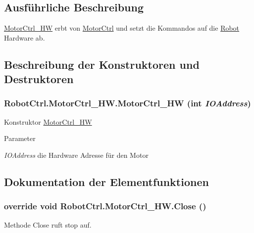 \subsection{Ausführliche Beschreibung}
\hyperlink{class_robot_ctrl_1_1_motor_ctrl___h_w}{MotorCtrl\_\-HW} erbt von \hyperlink{class_robot_ctrl_1_1_motor_ctrl}{MotorCtrl} und setzt die Kommandos auf die \hyperlink{class_robot_ctrl_1_1_robot}{Robot} Hardware ab. 

\subsection{Beschreibung der Konstruktoren und Destruktoren}
\hypertarget{class_robot_ctrl_1_1_motor_ctrl___h_w_af9fb7c75d12f00d852304d58bd31bcea}{
\subsubsection[{MotorCtrl\_\-HW}]{\setlength{\rightskip}{0pt plus 5cm}RobotCtrl.MotorCtrl\_\-HW.MotorCtrl\_\-HW (int {\em IOAddress})}}
\label{class_robot_ctrl_1_1_motor_ctrl___h_w_af9fb7c75d12f00d852304d58bd31bcea}
Konstruktor \hyperlink{class_robot_ctrl_1_1_motor_ctrl___h_w}{MotorCtrl\_\-HW}


\begin{DoxyParams}{Parameter}
\item[{\em IOAddress}]die Hardware Adresse f\"{u}r den Motor \end{DoxyParams}


\subsection{Dokumentation der Elementfunktionen}
\hypertarget{class_robot_ctrl_1_1_motor_ctrl___h_w_a134912d08a58d3762ce7694294599d7c}{
\subsubsection[{Close}]{\setlength{\rightskip}{0pt plus 5cm}override void RobotCtrl.MotorCtrl\_\-HW.Close ()}}
\label{class_robot_ctrl_1_1_motor_ctrl___h_w_a134912d08a58d3762ce7694294599d7c}
Methode Close ruft stop auf. 

